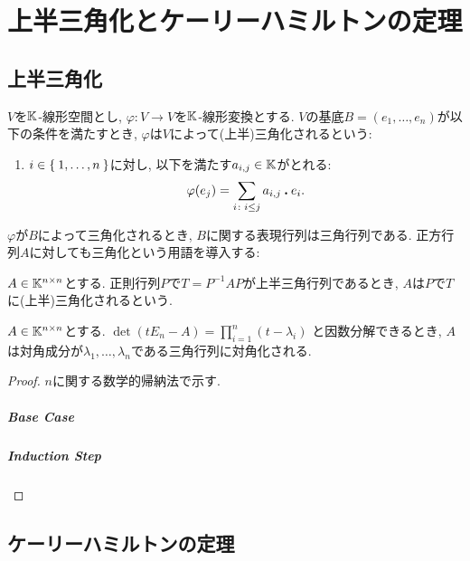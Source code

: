 \begin{quiz}
\end{quiz}

\chapter{上半三角化とケーリーハミルトンの定理}

\section{上半三角化}

\begin{definition}
$V$を$\mathbb{K}$-線形空間とし,
$\varphi\colon V\to V$を$\mathbb{K}$-線形変換とする.
$V$の基底$B=(e_1,\ldots,e_n)$が以下の条件を満たすとき,
$\varphi$は$V$によって(上半)三角化されるという:
\begin{enumerate}
\item
$i\in\Set{1,\ldots,n}$に対し,
以下を満たす$a_{i,j}\in\mathbb{K}$がとれる:
\begin{align*}
\varphi(e_j)=\sum_{i\colon i\leq j }a_{i,j}\mathbin{\boldsymbol{.}} e_i.
\end{align*}
\end{enumerate}
\end{definition}
$\varphi$が$B$によって三角化されるとき,
$B$に関する表現行列は三角行列である.
正方行列$A$に対しても三角化という用語を導入する:
\begin{definition}
$A\in \mathbb{K}^{n\times n}$とする.
正則行列$P$で$T=P^{-1}AP$が上半三角行列であるとき,
$A$は$P$で$T$に(上半)三角化されるという.
\end{definition}

\begin{prop}
$A\in \mathbb{K}^{n\times n}$とする.
$\det(tE_n-A)=\prod_{i=1}^n (t-\lambda_i)$
と因数分解できるとき,
$A$は対角成分が$\lambda_1,\ldots,\lambda_n$である三角行列に対角化される.
\end{prop}
\begin{proof}
$n$に関する数学的帰納法で示す.
\paragraph{Base Case}
\paragraph{Induction Step}
\end{proof}


\section{ケーリーハミルトンの定理}

